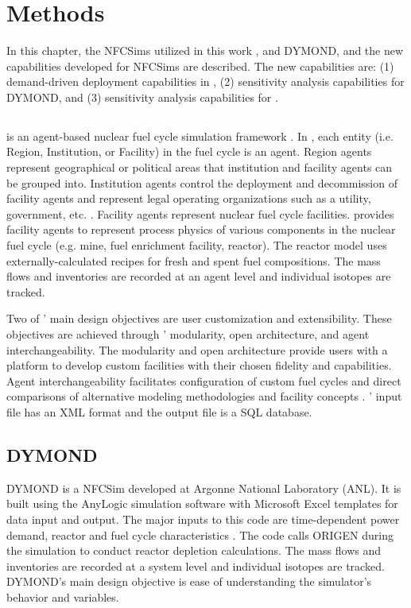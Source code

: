 \chapter{Methods}
\label{chap:3}
In this chapter, the \glspl{NFCSim} utilized in this work
, \Cyclus and DYMOND, and the new capabilities developed for 
\glspl{NFCSim} are described. 
The new capabilities are: 
(1) demand-driven deployment capabilities in \Cyclus, 
(2) sensitivity analysis capabilities for DYMOND, and
(3) sensitivity analysis capabilities for \Cyclus. 

\section{\Cyclus}
\Cyclus is an agent-based nuclear fuel cycle simulation framework 
\cite{huff_fundamental_2016}. 
In \Cyclus, each entity (i.e. Region, Institution, or Facility) in 
the fuel cycle is an agent. 
Region agents represent geographical or political areas that institution
and facility agents can be grouped into. 
Institution agents control the 
deployment and decommission of facility agents 
and represent legal operating organizations such as a 
utility, government, etc. \cite{huff_fundamental_2016}. 
Facility agents represent nuclear fuel cycle facilities. 
\Cycamore \cite{carlsen_cycamore_2014}
provides facility agents to represent process physics of various 
components in the nuclear fuel cycle (e.g. mine, fuel enrichment 
facility, reactor). 
The \Cycamore reactor model uses externally-calculated 
recipes for fresh and spent fuel compositions. 
The mass flows and inventories are recorded at an agent level
and individual isotopes are tracked. 

Two of \Cyclus' main design objectives are user customization and 
extensibility. 
These objectives are achieved through \Cyclus' modularity, 
open architecture, and agent interchangeability. 
The modularity and open architecture provide users with a 
platform to develop custom facilities with their chosen fidelity 
and capabilities. 
Agent interchangeability facilitates configuration of custom fuel 
cycles and direct comparisons of alternative modeling methodologies 
and facility concepts \cite{huff_fundamental_2016}. 
\Cyclus' input file has an XML format and the output file is 
a SQL database. 

\section{DYMOND}
DYMOND \cite{yacout_modeling_2005} is a \gls{NFCSim} developed 
at Argonne National Laboratory (\gls{ANL}). 
It is built using the AnyLogic simulation software with 
Microsoft Excel templates for data input and output. 
The major inputs to this code are time-dependent power demand, 
reactor and fuel cycle characteristics 
\cite{feng_standardized_2016}.   
The code calls ORIGEN \cite{bell_origen_1973} during the simulation 
to conduct reactor depletion calculations. 
The mass flows and inventories are recorded at a system level
and individual isotopes are tracked. 
DYMOND's main design objective is ease of understanding the  
simulator's behavior and variables. 

